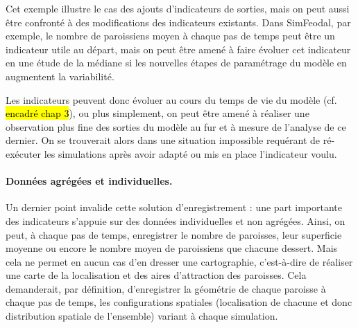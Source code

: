Cet exemple illustre le cas des ajouts d'indicateurs de sorties, mais on peut aussi être confronté à des modifications des indicateurs existants.
Dans SimFeodal, par exemple, le nombre de paroissiens moyen à chaque pas de temps peut être un indicateur utile au départ, mais on peut être amené à faire évoluer cet indicateur en une étude de la médiane si les nouvelles étapes de paramétrage du modèle en augmentent la variabilité.

Les indicateurs peuvent donc évoluer au cours du temps de vie du modèle (cf. \hl{encadré chap 3}), ou plus simplement, on peut être amené à réaliser une observation plus fine des sorties du modèle au fur et à mesure de l'analyse de ce dernier.
On se trouverait alors dans une situation impossible requérant de ré-exécuter les simulations après avoir adapté ou mis en place l'indicateur voulu.

\paragraph{Données agrégées et individuelles.}

Un dernier point invalide cette solution d'enregistrement : une part importante des indicateurs s'appuie sur des données individuelles et non agrégées.
Ainsi, on peut, à chaque pas de temps, enregistrer le nombre de paroisses, leur superficie moyenne ou encore le nombre moyen de paroissiens que chacune dessert.
Mais cela ne permet en aucun cas d'en dresser une cartographie, c'est-à-dire de réaliser une carte de la localisation et des aires d'attraction des paroisses.
Cela demanderait, par définition, d'enregistrer la géométrie de chaque paroisse à chaque pas de temps, les configurations spatiales (localisation de chacune et donc distribution spatiale de l'ensemble) variant à chaque simulation.

